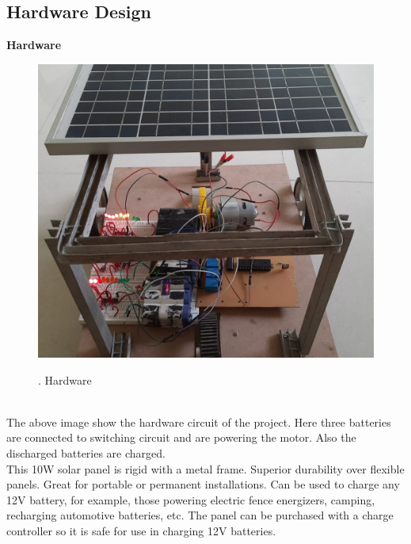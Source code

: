 \documentclass[a4paper,12pt]{article}
\begin{document}
\subsection{Hardware Design}
\textbf{Hardware}\\[1cm]
\begin{figure}[!h]
\centering
\includegraphics[scale=0.3]{hw1.jpeg}\\
\caption{. Hardware}
\end{figure}\\
The above image show the hardware circuit of the project. Here three batteries are connected to switching circuit and are powering the motor. Also the discharged batteries are charged.\\
This 10W solar panel is rigid with a metal frame. Superior durability over flexible panels. Great for portable or permanent installations. Can be used to charge any 12V battery, for example, those powering electric fence energizers, camping, recharging automotive batteries, etc. The panel can be purchased with a charge controller so it is safe for use in charging 12V batteries.
\end{document}

